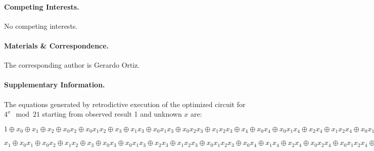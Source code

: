 \documentclass[sigplan]{acmart}
\begin{document}
\paragraph*{Competing Interests.}
No competing interests.

\paragraph*{Materials \& Correspondence.}
The corresponding author is Gerardo Ortiz. 

\paragraph*{Supplementary Information.} 
\label{par:shor21}

The equations generated by retrodictive execution of the optimized
circuit for $4^x \mod{21}$ starting from observed result 1 and unknown
$x$ are:

\bigskip

$1 \oplus x_0 \oplus x_1 \oplus x_2 \oplus x_0x_2 \oplus x_0x_1x_2
\oplus x_3 \oplus x_1x_3 \oplus x_0x_1x_3 \oplus x_0x_2x_3 \oplus
x_1x_2x_3 \oplus x_4 \oplus x_0x_4 \oplus x_0x_1x_4 \oplus x_2x_4
\oplus x_1x_2x_4 \oplus x_0x_1x_2x_4 \oplus x_0x_3x_4 \oplus x_1x_3x_4
\oplus x_2x_3x_4 \oplus x_0x_2x_3x_4 \oplus x_0x_1x_2x_3x_4 \oplus x_5
\oplus x_1x_5 \oplus x_0x_1x_5 \oplus x_0x_2x_5 \oplus x_1x_2x_5
\oplus x_3x_5 \oplus x_0x_3x_5 \oplus x_0x_1x_3x_5 \oplus x_2x_3x_5
\oplus x_1x_2x_3x_5 \oplus x_0x_1x_2x_3x_5 \oplus x_0x_4x_5 \oplus
x_1x_4x_5 \oplus x_2x_4x_5 \oplus x_0x_2x_4x_5 \oplus x_0x_1x_2x_4x_5
\oplus x_3x_4x_5 \oplus x_1x_3x_4x_5 \oplus x_0x_1x_3x_4x_5 \oplus
x_0x_2x_3x_4x_5 \oplus x_1x_2x_3x_4x_5 = 1$

\bigskip

$x_1 \oplus x_0x_1 \oplus x_0x_2 \oplus x_1x_2 \oplus x_3 \oplus
x_0x_3 \oplus x_0x_1x_3 \oplus x_2x_3 \oplus x_1x_2x_3 \oplus
x_0x_1x_2x_3 \oplus x_0x_4 \oplus x_1x_4 \oplus x_2x_4 \oplus
x_0x_2x_4 \oplus x_0x_1x_2x_4 \oplus x_3x_4 \oplus x_1x_3x_4 \oplus
x_0x_1x_3x_4 \oplus x_0x_2x_3x_4 \oplus x_1x_2x_3x_4 \oplus x_5 \oplus
x_0x_5 \oplus x_0x_1x_5 \oplus x_2x_5 \oplus x_1x_2x_5 \oplus
x_0x_1x_2x_5 \oplus x_0x_3x_5 \oplus x_1x_3x_5 \oplus x_2x_3x_5 \oplus
x_0x_2x_3x_5 \oplus x_0x_1x_2x_3x_5 \oplus x_4x_5 \oplus x_1x_4x_5
\oplus x_0x_1x_4x_5 \oplus x_0x_2x_4x_5 \oplus x_1x_2x_4x_5 \oplus
x_3x_4x_5 \oplus x_0x_3x_4x_5 \oplus x_0x_1x_3x_4x_5 \oplus
x_2x_3x_4x_5 \oplus x_1x_2x_3x_4x_5 \oplus x_0x_1x_2x_3x_4x_5 = 0$
\end{document}
